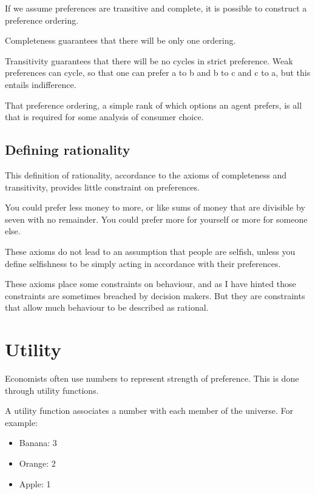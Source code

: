 \documentclass[
  letterpaper,
  DIV=11,
  numbers=noendperiod]{scrreprt}
\providecommand{\tightlist}{%
  \setlength{\itemsep}{0pt}\setlength{\parskip}{0pt}}\usepackage{longtable,booktabs,array}
\begin{document}
If we assume preferences are transitive and complete, it is possible to
construct a preference ordering.

Completeness guarantees that there will be only one ordering.

Transitivity guarantees that there will be no cycles in strict
preference. Weak preferences can cycle, so that one can prefer a to b
and b to c and c to a, but this entails indifference.

That preference ordering, a simple rank of which options an agent
prefers, is all that is required for some analysis of consumer choice.

\hypertarget{defining-rationality}{%
\section{Defining rationality}\label{defining-rationality}}

This definition of rationality, accordance to the axioms of completeness
and transitivity, provides little constraint on preferences.

You could prefer less money to more, or like sums of money that are
divisible by seven with no remainder. You could prefer more for yourself
or more for someone else.

These axioms do not lead to an assumption that people are selfish,
unless you define selfishness to be simply acting in accordance with
their preferences.

These axioms place some constraints on behaviour, and as I have hinted
those constraints are sometimes breached by decision makers. But they
are constraints that allow much behaviour to be described as rational.

\hypertarget{utility}{%
\chapter{Utility}\label{utility}}

Economists often use numbers to represent strength of preference. This
is done through utility functions.

A utility function associates a number with each member of the universe.
For example:

\begin{itemize}
\tightlist
\item
  Banana: 3
\item
  Orange: 2
\item
  Apple: 1
\end{itemize}
\end{document}

